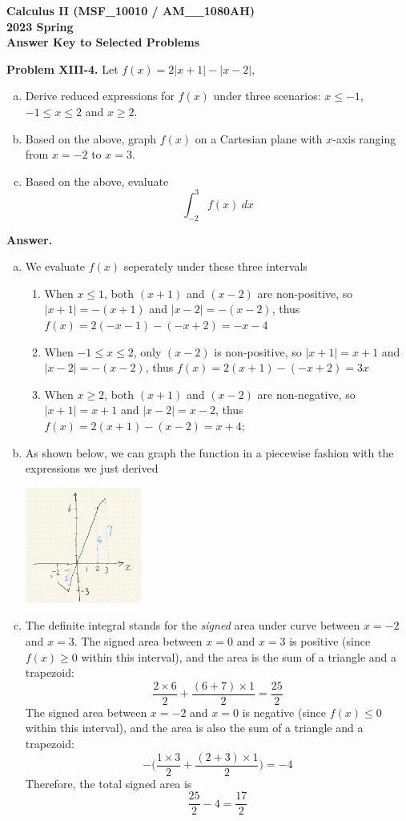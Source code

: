 \documentclass[11pt,letterpaper]{article}
\newcounter{problem}
\newcommand{\problem}[1]{
	\noindent \textbf{Problem #1. }%
}
\newcommand{\answer}{\noindent \textbf{Answer. }}
\begin{document}
\noindent\textbf{\large Calculus II (MSF\_10010 / AM\_\_1080AH) \\ 2023 Spring \\ Answer Key to Selected Problems}

\bigskip

\problem{XIII-4} Let $f(x) = 2|x+1| - |x-2|$,
\begin{enumerate}[(a)]
    \item Derive reduced expressions for $f(x)$ under three scenarios: $x \le -1$, $-1 \le x \le 2$ and $x \ge 2$.
    \item Based on the above, graph $f(x)$ on a Cartesian plane with $x$-axis ranging from $x = -2$ to $x = 3$.
    \item Based on the above, evaluate
    \[\int_{-2}^3 f(x)~dx\]
\end{enumerate}

\smallskip

\answer
\begin{enumerate}[(a)]
    \item We evaluate $f(x)$ seperately under these three intervals
    \begin{enumerate}[(1)]
        \item When $x \le 1$, both $(x+1)$ and $(x-2)$ are non-positive, so $|x+1| = -(x+1)$ and $|x-2| = -(x-2)$, thus $f(x) = 2(-x-1)-(-x+2) = -x-4$
        \item When $-1 \le x \le 2$, only $(x-2)$ is non-positive, so $|x+1| = x+1$ and $|x-2| = -(x-2)$, thus $f(x) = 2(x+1)-(-x+2) = 3x$
        \item When $x \ge 2$, both $(x+1)$ and $(x-2)$ are non-negative, so $|x+1| = x+1$ and $|x-2| = x-2$, thus $f(x) = 2(x+1)-(x-2) = x+4$;
    \end{enumerate}
    \item As shown below, we can graph the function in a piecewise fashion with the expressions we just derived
    \begin{center}
        \includegraphics[width = 0.3\textwidth]{sol_abs.png}
    \end{center}
    \item The definite integral stands for the \textit{signed} area under curve between $x=-2$ and $x=3$.  The signed area between $x=0$ and $x=3$ is positive (since $f(x) \ge 0$ within this interval), and the area is the sum of a triangle and a trapezoid:
    \[\frac{2 \times 6}{2} + \frac{(6+7) \times 1}{2} = \frac{25}{2}\]
    The signed area between $x=-2$ and $x=0$ is negative (since $f(x) \le 0$ within this interval), and the area is also the sum of a triangle and a trapezoid:
    \[-\Big(\frac{1 \times 3}{2} + \frac{(2+3) \times 1}{2}\Big) = -4\]
    Therefore, the total signed area is
    \[\frac{25}{2}-4 = \frac{17}{2}\]
\end{enumerate}
\end{document}
